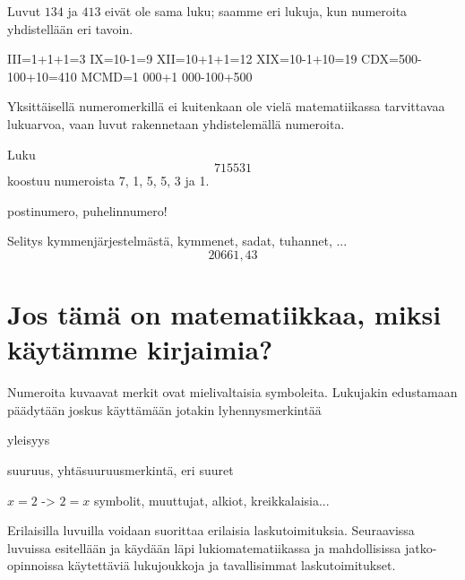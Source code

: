 Luvut $134$ ja $413$ eivät ole sama luku; saamme eri lukuja, kun numeroita yhdistellään eri tavoin.

\begin{esimerkki}
III=1+1+1=3
IX=10-1=9
XII=10+1+1=12
XIX=10-1+10=19
CDX=500-100+10=410
MCMD=1 000+1 000-100+500
\end{esimerkki}



Yksittäisellä numeromerkillä ei kuitenkaan ole vielä matematiikassa tarvittavaa lukuarvoa, vaan luvut rakennetaan yhdistelemällä numeroita.

\begin{esimerkki}
Luku \[715531\] koostuu numeroista 7, 1, 5, 5, 3 ja 1.
\end{esimerkki}






postinumero, puhelinnumero!


\begin{esimerkki}
Selitys kymmenjärjestelmästä, kymmenet, sadat, tuhannet, ...
\[20661,43\]
\end{esimerkki}



\section{Jos tämä on matematiikkaa, miksi käytämme kirjaimia?}

Numeroita kuvaavat merkit ovat mielivaltaisia symboleita. Lukujakin edustamaan päädytään joskus käyttämään jotakin lyhennysmerkintää

yleisyys

suuruus, yhtäsuuruusmerkintä, eri suuret

$x=2$
-> $2=x$
symbolit, muuttujat, alkiot, kreikkalaisia...





Erilaisilla luvuilla voidaan suorittaa erilaisia laskutoimituksia. Seuraavissa luvuissa esitellään ja käydään läpi lukiomatematiikassa ja mahdollisissa jatko-opinnoissa käytettäviä lukujoukkoja ja tavallisimmat laskutoimitukset.
